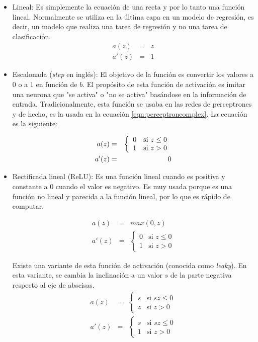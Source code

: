 \begin{itemize}
\item Lineal: Es simplemente la ecuación de una recta y por lo tanto una función lineal. Normalmente se utiliza en la última capa en un modelo de regresión, es decir, un modelo que realiza una tarea de regresión y no una tarea de clasificación.
\begin{eqnarray}
  a(z) & = & z \\
  a'(z) & = & 1 
\end{eqnarray}

\item Escalonada (\textit{step} en inglés): El objetivo de la función es convertir los valores a $0$ o a $1$ en función de $b$. El propósito de esta función de activación es imitar una neurona que "se activa" o "no se activa" basándose en la información de entrada. Tradicionalmente, esta función se usaba en las redes de perceptrones y de hecho, es la usada en la ecuación \ref{eqn:perceptroncomplex}. La ecuación es la siguiente:

\begin{eqnarray}
  a(z) & = & \left\{ \begin{array}{ll}
      0 & \mbox{si } z \leq 0 \\
      1 & \mbox{si } z > 0
      \end{array} \right. \\
     \newline
  a'(z) & = & 0 
\end{eqnarray}


\item Rectificada lineal (ReLU): Es una función lineal cuando es positiva y constante a 0 cuando el valor es negativo. Es muy usada porque es una función no lineal y parecida a la función lineal, por lo que es rápido de computar.

\begin{eqnarray}
    a(z) & = & max(0,z) \\
  a'(z) & = & \left\{ \begin{array}{ll}
      0 & \mbox{si } z \leq 0   \\
      1 & \mbox{si } z > 0 
      \end{array} \right.
\end{eqnarray}

Existe una variante de esta función de activación (conocida como \textit{leaky}). En esta variante, se cambia la inclinación a un valor $s$ de la parte negativa respecto al eje de abscisas. 
\begin{eqnarray}
    a(z) & = & \left\{ \begin{array}{ll}
      s & \mbox{si } sz \leq 0   \\
      z & \mbox{si } z > 0 
      \end{array} \right. \\
  a'(z) & = & \left\{ \begin{array}{ll}
      s & \mbox{si } sz \leq 0   \\
      1 & \mbox{si } z > 0 
      \end{array} \right.
\end{eqnarray}


\end{itemize}
